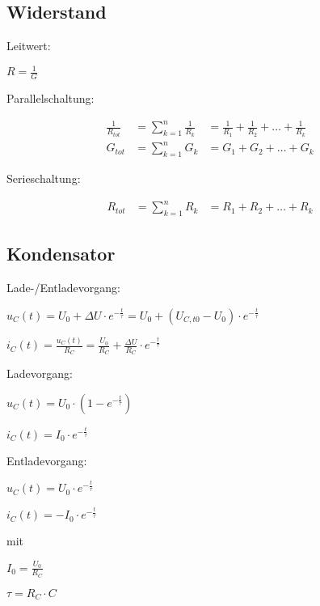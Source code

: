 \begin{sectionbox}
	\subsection{Widerstand}

	Leitwert:
	\begin{emphbox}
		$ R = \frac{1}{G} $\\
	\end{emphbox}	
	
	Parallelschaltung:
	\begin{emphbox}
		\begin{align*}
			\frac{1}{R_{tot}} &= \sum _{k=1}^{n}\frac{1}{R_k} &= \frac{1}{R_{1}} + \frac{1}{R_{2}} + \ldots + \frac{1}{R_k}\\
			G_{tot} &= \sum _{k=1}^{n}G_k &= G_1 + G_2 + \ldots + G_k
		\end{align*}
	\end{emphbox}
	
	Serieschaltung:
	\begin{emphbox}
			\begin{align*}
			R_{tot} &= \sum _{k=1}^{n}R_k &= R_1 + R_2 + \ldots + R_k
		\end{align*}

	\end{emphbox}

	
\end{sectionbox}


\begin{sectionbox}
	\subsection{Kondensator}

Lade-/Entladevorgang:
\begin{emphbox}
	$u_C(t) = U_0+ ΔU \cdot e^{-{\frac{t}{τ}}} = U_0+ (U_{C,t0}-U_0) \cdot e^{-{\frac{t}{τ}}}$

	$i_C(t) = \frac{u_C(t)}{R_C} = \frac{U_0}{R_C}+\frac{ΔU}{R_C}\cdot e^{-{\frac{t}{τ}}}$
\end{emphbox}

Ladevorgang:
\begin{emphbox}

	$u_C(t) = U_0 \cdot (1-e^{-{\frac{t}{τ}}})$

	$i_C(t) = I_0 \cdot e^{-{\frac{t}{τ}}}$

\end{emphbox}

Entladevorgang:
\begin{emphbox}
	$u_C(t) = U_0 \cdot e^{-{\frac{t}{τ}}}$

	$i_C(t) = -I_0 \cdot e^{-{\frac{t}{τ}}}$
\end{emphbox}

mit
\begin{emphbox}
	$I_0 = \frac{U_0}{R_C}$
	
	$τ = R_C \cdot C$
\end{emphbox}

	
\end{sectionbox}

